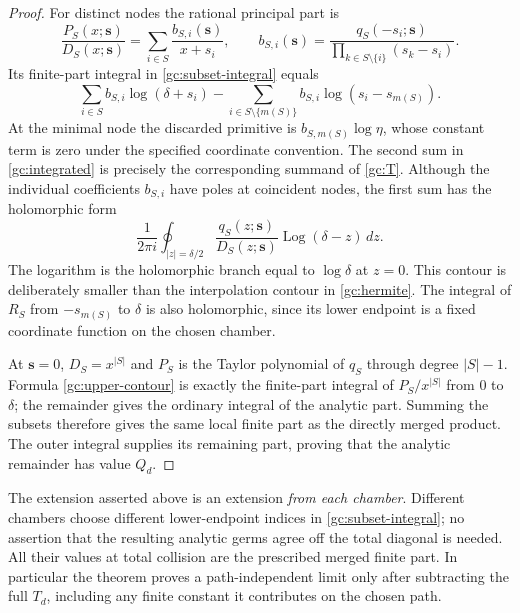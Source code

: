 \begin{proof}
For distinct nodes the rational principal part is
\[
 \frac{P_S(x;\boldsymbol{s})}{D_S(x;\boldsymbol{s})}
 =\sum_{i\in S}\frac{b_{S,i}(\boldsymbol{s})}{x+s_i},
 \qquad
 b_{S,i}(\boldsymbol{s})=
 \frac{q_S(-s_i;\boldsymbol{s})}
      {\prod_{k\in S\setminus\{i\}}(s_k-s_i)}.
\]
Its finite-part integral in \eqref{gc:subset-integral} equals
\begin{equation}\label{gc:integrated}
 \sum_{i\in S}b_{S,i}\log(\delta+s_i)
 -\sum_{i\in S\setminus\{m(S)\}}
       b_{S,i}\log(s_i-s_{m(S)}).
\end{equation}
At the minimal node the discarded primitive is $b_{S,m(S)}\log\eta$,
whose constant term is zero under the specified coordinate convention.
The second sum in \eqref{gc:integrated} is precisely the corresponding
summand of \eqref{gc:T}.  Although the individual coefficients $b_{S,i}$
have poles at coincident nodes, the first sum has the holomorphic form
\begin{equation}\label{gc:upper-contour}
 \frac1{2\pi i}\oint_{|z|=\delta/2}
 \frac{q_S(z;\boldsymbol{s})}{D_S(z;\boldsymbol{s})}
                      \operatorname{Log}(\delta-z)\,dz.
\end{equation}
The logarithm is the holomorphic branch equal to $\log\delta$ at $z=0$.
This contour is deliberately smaller than the interpolation contour in
\eqref{gc:hermite}.  The integral of $R_S$ from $-s_{m(S)}$ to $\delta$ is
also holomorphic, since its lower endpoint is a fixed coordinate function
on the chosen chamber.

At $\boldsymbol{s}=0$, $D_S=x^{|S|}$ and $P_S$ is the Taylor polynomial of
$q_S$ through degree $|S|-1$.  Formula \eqref{gc:upper-contour} is exactly
the finite-part integral of $P_S/x^{|S|}$ from $0$ to $\delta$; the
remainder gives the ordinary integral of the analytic part.  Summing the
subsets therefore gives the same local finite part as the directly
merged product.  The outer integral supplies its remaining part, proving
that the analytic remainder has value $Q_d$.
\end{proof}

\begin{remark}
The extension asserted above is an extension \emph{from each chamber}.
Different chambers choose different lower-endpoint indices in
\eqref{gc:subset-integral}; no assertion that the resulting analytic germs
agree off the total diagonal is needed.  All their values at total
collision are the prescribed merged finite part.  In particular the
theorem proves a path-independent limit only after subtracting the full
$T_d$, including any finite constant it contributes on the chosen path.
\end{remark}

